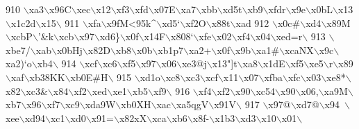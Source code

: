 \begin{DoxyCode}
{910 \textcolor{stringliteral}{\(\backslash\)xa3\(\backslash\)x96C\(\backslash\)xec\(\backslash\)x12\(\backslash\)xf3\(\backslash\)xfd\(\backslash\)x07E\(\backslash\)xa7\(\backslash\)xbb\(\backslash\)xd5t\(\backslash\)xb9\(\backslash\)xfdr\(\backslash\)x9e\(\backslash\)x0bL\(\backslash\)x13\(\backslash\)x1c2d\(\backslash\)x15\(\backslash\)}
911 \textcolor{stringliteral}{\(\backslash\)xfa\(\backslash\)x9fM<95k^\(\backslash\)xd5`\(\backslash\)xf2O\(\backslash\)x88t\(\backslash\)xad%
912 \textcolor{stringliteral}{\(\backslash\)x0c#\(\backslash\)xd4\(\backslash\)x89M\(\backslash\)xcbP\(\backslash\)'&k\(\backslash\)xcb\(\backslash\)x97\(\backslash\)xd6\}\(\backslash\)x0f\(\backslash\)x14F\(\backslash\)x808`\(\backslash\)xfe\(\backslash\)x02\(\backslash\)xf4\(\backslash\)x04\(\backslash\)xed=r\(\backslash\)}
913 \textcolor{stringliteral}{\(\backslash\)xbe7/\(\backslash\)xab\(\backslash\)x0bHj\(\backslash\)x82D\(\backslash\)xb8\(\backslash\)x0b\(\backslash\)xb1p7\(\backslash\)xa2+\(\backslash\)x0f\(\backslash\)x9b\(\backslash\)xa1#\(\backslash\)xcaNX\(\backslash\)x9c\(\backslash\)xa2)`o\(\backslash\)xb4\(\backslash\)}
914 \textcolor{stringliteral}{\(\backslash\)xcf\(\backslash\)xc6\(\backslash\)xf5\(\backslash\)x97\(\backslash\)x06\(\backslash\)xe3@j\(\backslash\)x13"]t\(\backslash\)xa8\(\backslash\)x1dE\(\backslash\)xf5\(\backslash\)xe5\(\backslash\)r\(\backslash\)x89\(\backslash\)xaf\(\backslash\)xb38KK\(\backslash\)xb0E#H\(\backslash\)}
915 \textcolor{stringliteral}{\(\backslash\)xd1o\(\backslash\)xc8\(\backslash\)xc3\(\backslash\)xcf\(\backslash\)x11\(\backslash\)x07\(\backslash\)xfba\(\backslash\)xfc\(\backslash\)x03\(\backslash\)xe8*\(\backslash\)x82\(\backslash\)xc3&\(\backslash\)x84\(\backslash\)xf2\(\backslash\)xed\(\backslash\)xe1\(\backslash\)xb5\(\backslash\)xf9\(\backslash\)}
916 \textcolor{stringliteral}{\(\backslash\)xf4\(\backslash\)xf2\(\backslash\)x90\(\backslash\)xc54\(\backslash\)x90\(\backslash\)x06,\(\backslash\)xa9M\(\backslash\)xb7\(\backslash\)x96\(\backslash\)xf7\(\backslash\)xc9\(\backslash\)xda9W\(\backslash\)xb0XH\(\backslash\)xac\(\backslash\)xa5qgV\(\backslash\)x91V\(\backslash\)}
917 \textcolor{stringliteral}{\(\backslash\)x97@\(\backslash\)xd7@\(\backslash\)x94~\(\backslash\)xee\(\backslash\)xd94\(\backslash\)xc1\(\backslash\)xd0\(\backslash\)x91=\(\backslash\)x82xX\(\backslash\)xca\(\backslash\)xb6\(\backslash\)x8f-\(\backslash\)x1b3\(\backslash\)xd3\(\backslash\)x10\(\backslash\)x01\(\backslash\)}
}}
\end{DoxyCode}
